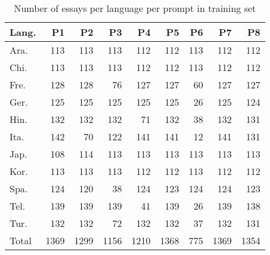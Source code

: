 \documentclass[11pt,letterpaper]{article}
\begin{document}
\begin{table*}[htb]
    \label{tab:prompts-train}
    \begin{center}
        \begin{tabular}{lrrrrrrrr}
            \hline
            \textbf{Lang.} & \textbf{P1} & \textbf{P2} & \textbf{P3} & \textbf{P4} & \textbf{P5} & \textbf{P6} & \textbf{P7} & \textbf{P8}\\ \hline
            Ara.     &  113 & 113 & 113 & 112 & 112 & 113 & 112 & 112 \\ \hline
            Chi.    &  113 & 113 & 113 & 112 & 112 & 113 & 112 & 112 \\ \hline
            Fre.     &  128 & 128 & 76  & 127 & 127 & 60  & 127 & 127 \\ \hline
            Ger.     &  125 & 125 & 125 & 125 & 125 & 26  & 125 & 124 \\ \hline
            Hin.      &  132 & 132 & 132 & 71  & 132 & 38  & 132 & 131 \\ \hline
            Ita.    &  142 & 70  & 122 & 141 & 141 & 12  & 141 & 131 \\ \hline
            Jap.   &  108 & 114 & 113 & 113 & 113 & 113 & 113 & 113 \\ \hline
            Kor.     &  113 & 113 & 113 & 112 & 112 & 113 & 112 & 112 \\ \hline
            Spa.    &  124 & 120 & 38  & 124 & 123 & 124 & 124 & 123 \\ \hline
            Tel.     &  139 & 139 & 139 & 41  & 139 & 26  & 139 & 138 \\ \hline
            Tur.    &  132 & 132 & 72  & 132 & 132 & 37  & 132 & 131 \\ \hline \hline
            Total      &  1369 & 1299 & 1156 & 1210 & 1368 & 775 & 1369 & 1354 \\ \hline
        \end{tabular}
    \end{center}
    \caption{Number of essays per language per prompt in training set}
\end{table*}
\end{document}
